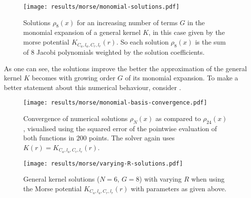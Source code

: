 \begin{figure}[H]
  \centering
  \label{fig:monomial-solutions}
  \texttt{[image: results/morse/monomial-solutions.pdf]}
  \caption[]{Solutions $\rho_8(x)$ for an increasing number of terms $G$ in the monomial expansion of a general kernel $K$, in this case given by the morse potential $K_{C_a, l_a, C_r, l_r}(r)$. So each solution $\rho_8(x)$ is the sum of $8$ Jacobi polynomials weighted by the solution coefficients.}
\end{figure}

As one can see, the solutions improve the better the approximation of the general kernel $K$ becomes with growing order $G$ of its monomial expansion.
To make a better statement about this numerical behaviour, consider .

\begin{figure}[H]
  \centering
  \label{fig:monomial-basis-convergence}
  \texttt{[image: results/morse/monomial-basis-convergence.pdf]}
  \caption[Step-by-step convergence of solutions when increasing the degree of the monomial]{
    Convergence of numerical solutions $\rho_N(x)$ as compared to $\rho_{24}(x)$, visualised using the squared error of the pointwise evaluation of both functions in $200$ points.
    The solver again uses $K(r) = K_{C_a, l_a, C_r, l_r}(r)$.
  }
\end{figure}

\begin{figure}[H]
  \centering
  \label{fig:varying-R-solutions}
  \texttt{[image: results/morse/varying-R-solutions.pdf]}
  \caption[Solutions with varying $R$]{General kernel solutions ($N = 6$, $G = 8$) with varying $R$ when using the Morse potential $K_{C_a, l_a, C_r, l_r}(r)$ with parameters as given above.}
\end{figure}
